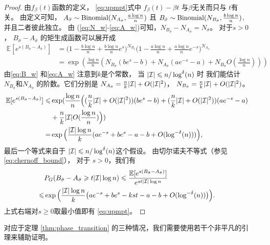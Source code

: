 \begin{proof}
  由$f_{\beta}(t)$函数的定义，
  \eqref{eq:upmpt}式中
  $f_{\beta}(t) - \beta t$ 与$\beta$无关而只与
  $t$有关。
	由定义可知，
  $A_{\bar{\sigma}}\sim \operatorname{Binomial}(N_{A_{\bar{\sigma}}},\frac{a\log n}{n})$
  且
	$B_{\bar{\sigma}}\sim\operatorname{Binomial}(N_{B_{\bar{\sigma}}},\frac{b\log n}{n})$,
  并且二者彼此独立。
  由 (\ref{eq:N_w}-\ref{eq:A_w})可知，$N_{B_{\bar{\sigma}}} - N_{A_{\bar{\sigma}}}
  = N_{\bar{\sigma}}$。
  对于$s>0$，
  $B_{\bar{\sigma}}-A_{\bar{\sigma}}$ 的矩生成函数可以展开成
	\begin{align*}
	 \mathbb{E}[e^{s(B_{\bar{\sigma}}-A_{\bar{\sigma}})}] 
	& =\Big(1-\frac{b\log n}{n}+\frac{b\log n}{n} e^s \Big)^{N_{B_{\bar{\sigma}}}}
	\Big(1-\frac{a\log n}{n}+\frac{a\log n}{n} e^{-s} \Big)^{N_{A_{\bar{\sigma}}}}  \\
	& = \exp\left(\frac{\log n}{n}\left(N_{B_{\bar{\sigma}}}
  (be^s - b) + N_{A_{\bar{\sigma}}}(ae^{-s}-a) + N_{B_{\bar{\sigma}}}
  O \left(\frac{\log n}{n} \right) \right) \right)
	\end{align*}
	由\eqref{eq:B_w}
  和\eqref{eq:A_w}
  注意到$k$是个常数，
  当
  $|\mathcal{I}| \leqslant n/\log^{\delta}(n)$ 时
	我们能估计
  $N_{B_{\bar{\sigma}}}$和$N_{A_{\bar{\sigma}}}$
  的阶数。它们分别是
  $N_{A_{\bar{\sigma}}} = \frac{n}{k}|\mathcal{I}| + O(|\mathcal{I}|^2)$，
	 $N_{B_{\bar{\sigma}}} = \frac{n}{k}|\mathcal{I}| + O(|\mathcal{I}|^2)$。
	\begin{align*}
	\mathbb{E}[e^{s(B_{\bar{\sigma}}-A_{\bar{\sigma}})}]
   \leqslant&
	\exp(\frac{\log n}{n}\Big((\frac{n}{k}|\mathcal{I}| + O(|\mathcal{I}|^2))(be^s - b) +(\frac{n}{k} |\mathcal{I}| + O(|\mathcal{I}|^2))(ae^{-s}-a) \\
  &+ \frac{n}{k}|\mathcal{I}|O(\frac{\log n}{n}) \Big))\\
	=
  & \exp\Big(\frac{|\mathcal{I}| \log n}{k}(a e^{-s}+b e^s-a-b +
	O(\log^{-\delta}(n))) \Big),
	\end{align*}
	最后一个等式来自于
  $ |\mathcal{I}| \leqslant n/\log^{\delta}(n)$这个假设。
	由切尔诺夫不等式（参见 \eqref{eq:chernoff_bound}），
  对于 $s>0$，我们有
	\begin{align*} 
	& P_G(B_{\bar{\sigma}}-A_{\bar{\sigma}}\geqslant t |\mathcal{I}| \log n)\leqslant
	\frac{\mathbb{E}[e^{s(B_{\bar{\sigma}}-A_{\bar{\sigma}})}]}{e^{st |\mathcal{I}|  \log n}}  \\
	\leqslant & \exp\Big(\frac{|\mathcal{I}|\log n}{k} \big(a e^{-s}+b e^s -kst -a-b
	+ O(\log^{-\delta}(n)) \big)\Big)  .
	\end{align*}
	上式右端对$s\geq 0$取最小值即有
  \eqref{eq:upmpt}。  
	\end{proof}

  对应于定理 \ref{thm:phase_transition} 的三种情况，我们需要使用若干个非平凡的引理来辅助证明。

